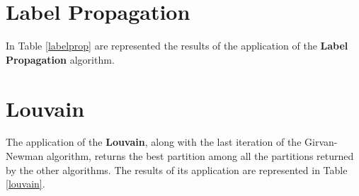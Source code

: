
\section{Label Propagation} %
\label{sec:label_propagation}
    In Table \ref{labelprop} are represented the results of the application of the \textbf{Label Propagation}
    algorithm.

    \begin{table}[H]
        \centering
        \begin{subtable}{\textwidth}
        \end{subtable}
        \caption{Evaluation of the partition obtained by the application of the Label Propagaion algorithm.}
        \label{labelprop}
    \end{table}


\section{Louvain} %
\label{sec:louvain}
    The application of the \textbf{Louvain}, along with the last iteration of the Girvan-Newman algorithm,
    returns the best partition among all the partitions returned by the other algorithms. The results of its
    application are represented in Table \ref{louvain}.

    \begin{table}[H]
        \centering
        \begin{subtable}{\textwidth}
        \end{subtable}
        \caption{Evaluation of the partition obtained by the application of the Louvain algorithm.}
        \label{louvain}
    \end{table}

